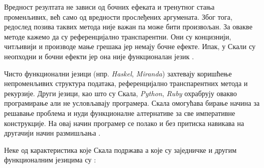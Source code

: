 \documentclass[12pt,oneside]{memoir}
\begin{document}
Вредност резултата не зависи од бочних ефеката и тренутног стања променљивих, већ само од вредности прослеђених аргумената. Због тога, редослед позива таквих метода није важан па може бити произвољан. За овакве методе кажемо да су референцијално транспарентни. Они су концизнији, читљивији и производе мање грешака јер немају бочне ефекте. Ипак, у Скали су неопходни и бочни ефекти јер она није функционалан језик \cite{funkMilena}.
\par Чисто функционални језици (нпр. \textit{Haskel}, \textit{Miranda}) захтевају коришћење непроменљивих структура података, референцијално транспарентних метода и рекурзије. Други језици, као што су Скала, \textit{Python}, \textit{Ruby} охрабрују овакво програмирање али не условљавају програмера. Скала омогућава бирање начина за решавање проблема и нуди функционалне алтернативе за све императивне конструкције. На овај начин програмер се полако и без притиска навикава на другачији начин размишљања \cite{funkMilena, progInScala}.
\par Неке од карактеристика које Скала подржава а које су заједничке и другим функционалним језицима су \cite{progInScala}:
\end{document}
